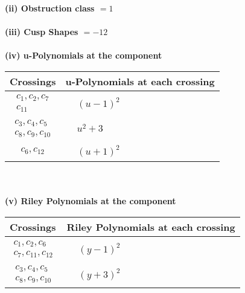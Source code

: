 \documentclass[1p]{elsarticle_modified}
\theoremstyle{definition}
\begin{document}
\flushleft \textbf{(ii) Obstruction class $= 1$}\\~\\
\flushleft \textbf{(iii) Cusp Shapes $= -12$}\\~\\
\newpage\renewcommand{\arraystretch}{1}
\flushleft \textbf{(iv) u-Polynomials at the component}\newline \\
\begin{tabular}{m{50pt}|m{274pt}}
Crossings & \hspace{64pt}u-Polynomials at each crossing \\
\hline $$\begin{aligned}c_{1},c_{2},c_{7}\\c_{11}\end{aligned}$$&$\begin{aligned}
&(u-1)^2
\end{aligned}$\\
\hline $$\begin{aligned}c_{3},c_{4},c_{5}\\c_{8},c_{9},c_{10}\end{aligned}$$&$\begin{aligned}
&u^2+3
\end{aligned}$\\
\hline $$\begin{aligned}c_{6},c_{12}\end{aligned}$$&$\begin{aligned}
&(u+1)^2
\end{aligned}$\\
\hline
\end{tabular}\\~\\
\newpage\renewcommand{\arraystretch}{1}
\flushleft \textbf{(v) Riley Polynomials at the component}\newline \\
\begin{tabular}{m{50pt}|m{274pt}}
Crossings & \hspace{64pt}Riley Polynomials at each crossing \\
\hline $$\begin{aligned}c_{1},c_{2},c_{6}\\c_{7},c_{11},c_{12}\end{aligned}$$&$\begin{aligned}
&(y-1)^2
\end{aligned}$\\
\hline $$\begin{aligned}c_{3},c_{4},c_{5}\\c_{8},c_{9},c_{10}\end{aligned}$$&$\begin{aligned}
&(y+3)^2
\end{aligned}$\\
\hline
\end{tabular}\\~\\
\end{document}
